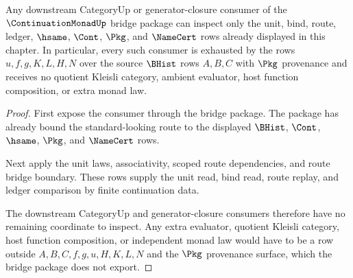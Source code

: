 \begin{theorem}
\label{thm:continuation-monad-downstream-consumer-exhaustion}
Any downstream CategoryUp or generator-closure consumer of the $\ContinuationMonadUp$ bridge package can inspect only the unit, bind, route, ledger, $\hsame$, $\Cont$, $\Pkg$, and $\NameCert$ rows already displayed in this chapter. In particular, every such consumer is exhausted by the rows $u,f,g,K,L,H,N$ over the source $\BHist$ rows $A,B,C$ with $\Pkg$ provenance and receives no quotient Kleisli category, ambient evaluator, host function composition, or extra monad law.
\end{theorem}
\begin{proof}
First expose the consumer through the bridge package. The package has already bound the standard-looking route to the displayed $\BHist$, $\Cont$, $\hsame$, $\Pkg$, and $\NameCert$ rows.

Next apply the unit laws, associativity, scoped route dependencies, and route bridge boundary. These rows supply the unit read, bind read, route replay, and ledger comparison by finite continuation data.

The downstream CategoryUp and generator-closure consumers therefore have no remaining coordinate to inspect. Any extra evaluator, quotient Kleisli category, host function composition, or independent monad law would have to be a row outside $A,B,C,f,g,u,H,K,L,N$ and the $\Pkg$ provenance surface, which the bridge package does not export.
\end{proof}


